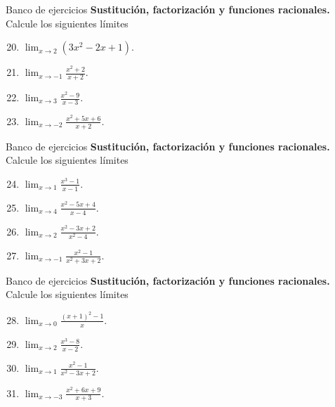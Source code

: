 \documentclass[12pt,aspectratio=169]{beamer}
\begin{document}
\begin{frame}[t,allowframebreaks]{Banco de ejercicios}
\small
\noindent \textbf{Sustitución, factorización y funciones racionales.} Calcule los siguientes l\'imites\par\smallskip
\begin{enumerate}\setcounter{enumi}{19}
\item $\displaystyle\lim_{x\to2}(3x^2-2x+1)$.
\item $\displaystyle\lim_{x\to-1}\frac{x^2+2}{x+2}$.
\item $\displaystyle\lim_{x\to3}\frac{x^2-9}{x-3}$.
\item $\displaystyle\lim_{x\to-2}\frac{x^2+5x+6}{x+2}$.
\end{enumerate}
\end{frame}


\begin{frame}[t,allowframebreaks]{Banco de ejercicios}
\small
\noindent \textbf{Sustitución, factorización y funciones racionales.} Calcule los siguientes l\'imites\par\smallskip
\begin{enumerate}\setcounter{enumi}{23}
\item $\displaystyle\lim_{x\to1}\frac{x^3-1}{x-1}$.
\item $\displaystyle\lim_{x\to4}\frac{x^2-5x+4}{x-4}$.
\item $\displaystyle\lim_{x\to2}\frac{x^2-3x+2}{x^2-4}$.
\item $\displaystyle\lim_{x\to-1}\frac{x^2-1}{x^2+3x+2}$.
\end{enumerate}
\end{frame}


\begin{frame}[t,allowframebreaks]{Banco de ejercicios}
\small
\noindent \textbf{Sustitución, factorización y funciones racionales.} Calcule los siguientes l\'imites\par\smallskip
\begin{enumerate}\setcounter{enumi}{27}
\item $\displaystyle\lim_{x\to0}\frac{(x+1)^2-1}{x}$.
\item $\displaystyle\lim_{x\to2}\frac{x^3-8}{x-2}$.
\item $\displaystyle\lim_{x\to1}\frac{x^2-1}{x^2-3x+2}$.
\item $\displaystyle\lim_{x\to-3}\frac{x^2+6x+9}{x+3}$.
\end{enumerate}
\end{frame}
\end{document}
